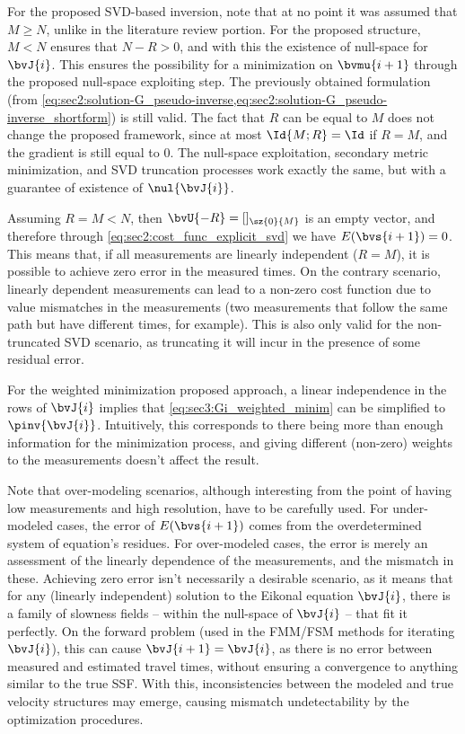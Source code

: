 For the proposed SVD-based inversion, note that at no point it was assumed that $M \geq N$, unlike in the literature review portion. For the proposed structure, $M < N$ ensures that $N-R > 0$, and with this the existence of null-space for $\bvJ{i}$. This ensures the possibility for a minimization on $\bvmu{i+1}$ through the proposed null-space exploiting step. The previously obtained formulation (from \cref{eq:sec2:solution-G_pseudo-inverse,eq:sec2:solution-G_pseudo-inverse_shortform}) is still valid. The fact that $R$ can be equal to $M$ does not change the proposed framework, since at most $\Id{M;R} = \Id$ if $R = M$, and the gradient is still equal to $0$. The null-space exploitation, secondary metric minimization, and SVD truncation processes work exactly the same, but with a guarantee of existence of $\nul{\bvJ{i}}$.

Assuming $R = M < N$, then $\bvU{-R} = []_{\sz{0}{M}}$ is an empty vector, and therefore through \cref{eq:sec2:cost_func_explicit_svd} we have $E(\bvs{i+1}) = 0$. This means that, if all measurements are linearly independent ($R=M$), it is possible to achieve zero error in the measured times. On the contrary scenario, linearly dependent measurements can lead to a non-zero cost function due to value mismatches in the measurements (two measurements that follow the same path but have different times, for example). This is also only valid for the non-truncated SVD scenario, as truncating it will incur in the presence of some residual error.

For the weighted minimization proposed approach, a linear independence in the rows of $\bvJ{i}$ implies that \cref{eq:sec3:Gi_weighted_minim} can be simplified to $\pinv{\bvJ{i}}$. Intuitively, this corresponds to there being more than enough information for the minimization process, and giving different (non-zero) weights to the measurements doesn't affect the result.

Note that over-modeling scenarios, although interesting from the point of having low measurements and high resolution, have to be carefully used. For under-modeled cases, the error of $E(\bvs{i+1})$ comes from the overdetermined system of equation's residues. For over-modeled cases, the error is merely an assessment of the linearly dependence of the measurements, and the mismatch in these. Achieving zero error isn't necessarily a desirable scenario, as it means that for any (linearly independent) solution to the Eikonal equation $\bvJ{i}$, there is a family of slowness fields -- within the null-space of $\bvJ{i}$ -- that fit it perfectly. On the forward problem (used in the FMM/FSM methods for iterating $\bvJ{i}$), this can cause $\bvJ{i+1} = \bvJ{i}$, as there is no error between measured and estimated travel times, without ensuring a convergence to anything similar to the true SSF. With this, inconsistencies between the modeled and true velocity structures may emerge, causing mismatch undetectability by the optimization procedures.

